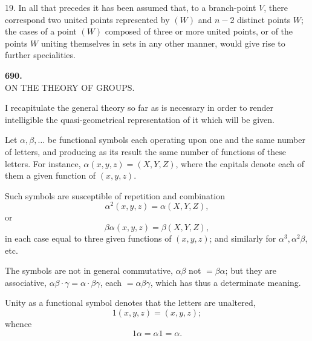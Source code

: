 \documentclass[11pt,a4paper]{article}
\begin{document}
\medskip

19. In all that precedes it has been assumed that, to a branch-point $V$, there correspond two united points represented by $(W)$ and $n - 2$ distinct points $W$; the cases of a point $(W)$ composed of three or more united points, or of the points $W$ uniting themselves in sets in any other manner, would give rise to further specialities.

\newpage



\begin{center}
\textbf{690.}\\[6pt]
\large ON THE THEORY OF GROUPS.
\end{center}

\medskip


\medskip

I recapitulate the general theory so far as is necessary in order to render intelligible the quasi-geometrical representation of it which will be given.

\medskip

Let $\alpha, \beta, \ldots$ be functional symbols each operating upon one and the same number of letters, and producing as its result the same number of functions of these letters. For instance, $\alpha(x, y, z) = (X, Y, Z)$, where the capitals denote each of them a given function of $(x, y, z)$.

\medskip

Such symbols are susceptible of repetition and combination
\[
\alpha^{2}(x, y, z) = \alpha(X, Y, Z),
\]
or
\[
\beta\alpha(x, y, z) = \beta(X, Y, Z),
\]
in each case equal to three given functions of $(x, y, z)$; and similarly for $\alpha^{3}, \alpha^{2}\beta$, etc.

\medskip

The symbols are not in general commutative, $\alpha\beta$ not $= \beta\alpha$; but they are associative, $\alpha\beta\cdot\gamma = \alpha\cdot\beta\gamma$, each $= \alpha\beta\gamma$, which has thus a determinate meaning.

\medskip

Unity as a functional symbol denotes that the letters are unaltered,
\[
1(x, y, z) = (x, y, z);
\]
whence
\[
1\alpha = \alpha 1 = \alpha.
\]
\end{document}
